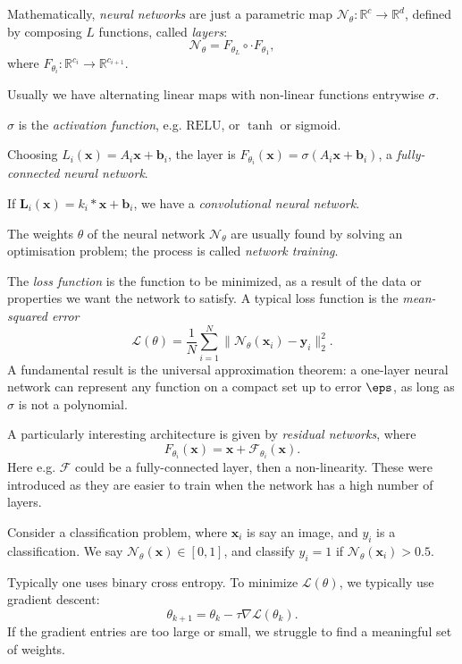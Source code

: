 \documentclass[12pt]{article}
\begin{document}
Mathematically, \emph{neural networks} are just a parametric map $\mathcal{N}_\theta : \mathbb{R}^{c} \to \mathbb{R}^{d}$, defined by composing $L$ functions, called \emph{layers}:
\[
\mathcal{N}_\theta = F_{\theta_L} \circ \cdot F_{\theta_1},
\]
where $F_{\theta_i} : \mathbb{R}^{c_i} \to \mathbb{R}^{c_{i+1}}$.

Usually we have alternating linear maps with non-linear functions entrywise $\sigma$.

$\sigma$ is the \emph{activation function}, e.g. $\mathrm{RELU}$, or $\tanh$ or sigmoid.

Choosing $L_i(\mathbf{x}) = A_i \mathbf{x} + \mathbf{b}_i$, the layer is $F_{\theta_i}(\mathbf{x}) = \sigma(A_i \mathbf{x} + \mathbf{b}_i)$, a \emph{fully-connected neural network}.

If $\mathbf{L}_i(\mathbf{x}) = k_i \ast \mathbf{x} + \mathbf{b}_i$, we have a \emph{convolutional neural network}.

The weights $\theta$ of the neural network $\mathcal{N}_\theta$ are usually found by solving an optimisation problem; the process is called \emph{network training}.

The \emph{loss function} is the function to be minimized, as a result of the data or properties we want the network to satisfy. A typical loss function is the \emph{mean-squared error}
\[
\mathcal{L}(\theta) = \frac 1N \sum_{i = 1}^N \|\mathcal{N}_\theta (\mathbf{x}_i) - \mathbf{y}_i\|_2^2.
\]
A fundamental result is the universal approximation theorem: a one-layer neural network can represent any function on a compact set up to error $\eps$, as long as $\sigma$ is not a polynomial.


A particularly interesting architecture is given by \emph{residual networks}, where
\[
F_{\theta_i}(\mathbf{x}) = \mathbf{x} + \mathcal{F}_{\theta_i}(\mathbf{x}).
\]
Here e.g. $\mathcal{F}$ could be a fully-connected layer, then a non-linearity. These were introduced as they are easier to train when the network has a high number of layers.

Consider a classification problem, where $\mathbf{x}_i$ is say an image, and $y_i$ is a classification. We say $\mathcal{N}_\theta(\mathbf{x}) \in [0, 1]$, and classify $y_i = 1$ if $\mathcal{N}_{\theta}(\mathbf{x}_i) > 0.5$.

Typically one uses binary cross entropy. To minimize $\mathcal{L}(\theta)$, we typically use gradient descent:
\[
\theta_{k+1} = \theta_k - \tau \nabla \mathcal{L}(\theta_k).
\]
If the gradient entries are too large or small, we struggle to find a meaningful set of weights.
\end{document}
